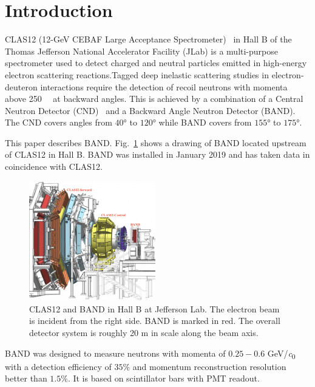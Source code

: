 \documentclass[3p,final,twocolumn]{elsarticle}
\begin{document}
\linenumbers


\setcounter{footnote}{0}
\renewcommand{\thefootnote}{\alph{footnote}}
\section{Introduction}


CLAS12 (12-GeV CEBAF Large Acceptance
Spectrometer)~\cite{Burkert:2020akg} in Hall B of the Thomas Jefferson
National Accelerator Facility (JLab) is a multi-purpose spectrometer
used to detect charged and neutral particles emitted in high-energy
electron scattering reactions.Tagged deep inelastic scattering studies
in electron-deuteron interactions require the detection of recoil
neutrons with momenta above \SI{250}{\mega\eVperc} at backward angles.
This is achieved by a combination of a Central Neutron Detector
(CND)~\cite{Chatagnon:2020lwt} and a Backward Angle Neutron Detector
(BAND). The CND covers angles from $40$\si{\degree} to
$120$\si{\degree} while BAND covers from $155$\si{\degree} to
$175$\si{\degree}.

This paper describes BAND.  Fig.~\ref{fig:clas12band} shows a drawing
of BAND
located upstream of CLAS12
in Hall B. BAND was installed in January 2019 and has
taken data in coincidence with CLAS12.


\begin{figure}[t!]
	\centering
	\includegraphics[width=0.49\textwidth]{BandInClas.png}
        \caption{CLAS12 and BAND in Hall B at Jefferson Lab. The
          electron beam is incident from the right side. BAND is
          marked in red. The overall detector system is roughly 20
          \si{\meter} in scale along the beam axis. }
		\label{fig:clas12band}
\end{figure}

BAND was designed to measure neutrons with momenta
of $0.25 - 0.6$ \si{\GeV/\clight} with a detection efficiency of
$35$\% and momentum reconstruction resolution better than $1.5\%$. It
is based on scintillator bars with PMT readout.
\end{document}
